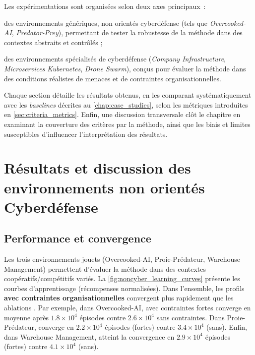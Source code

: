 Les expérimentations sont organisées selon deux axes principaux~:
\begin{enumerate*}[label={\roman*)}, itemjoin={; \quad}]
    \item des environnements génériques, non orientés cyberdéfense (tels que \textit{Overcooked-AI}, \textit{Predator-Prey}), permettant de tester la robustesse de la méthode dans des contextes abstraits et contrôlés ;
    \item des environnements spécialisés de cyberdéfense (\textit{Company Infrastructure}, \textit{Microservices Kubernetes}, \textit{Drone Swarm}), conçus pour évaluer la méthode dans des conditions réalistes de menaces et de contraintes organisationnelles.
\end{enumerate*}

Chaque section détaille les résultats obtenus, en les comparant systématiquement avec les \textit{baselines} décrites au \autoref{chap:case_studies}, selon les métriques introduites en \autoref{sec:criteria_metrics}.
Enfin, une discussion transversale clôt le chapitre en examinant la couverture des critères par la méthode, ainsi que les biais et limites susceptibles d’influencer l’interprétation des résultats.

\section{Résultats et discussion des environnements non orientés Cyberdéfense}\label{sec:results_and_discussion_cyberdefense}

\subsection*{Performance et convergence}

Les trois environnements jouets (Overcooked-AI, Proie-Prédateur, Warehouse Management) permettent d’évaluer la méthode  dans des contextes coopératifs/compétitifs variés.
La \autoref{fig:noncyber_learning_curves} présente les courbes d’apprentissage (récompenses normalisées).
Dans l’ensemble, les profils \textbf{avec contraintes organisationnelles} convergent plus rapidement que les ablations \texttt{}.
Par exemple, dans Overcooked-AI,  avec contraintes fortes converge en moyenne après $1.8\times 10^4$ épisodes contre $2.6\times 10^4$ sans contraintes.
Dans Proie-Prédateur,  converge en $2.2\times 10^4$ épisodes (fortes) contre $3.4\times 10^4$ (sans).
Enfin, dans Warehouse Management,  atteint la convergence en $2.9\times 10^4$ épisodes (fortes) contre $4.1\times 10^4$ (sans).

